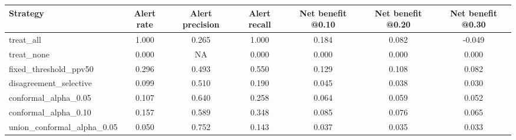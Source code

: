\begin{tabular}{@{}lcccccc@{}}
\toprule
Strategy & Alert rate & Alert precision & Alert recall & Net benefit @0.10 & Net benefit @0.20 & Net benefit @0.30\\
\midrule
treat\_all & 1.000 & 0.265 & 1.000 & 0.184 & 0.082 & -0.049\\
treat\_none & 0.000 & NA & 0.000 & 0.000 & 0.000 & 0.000\\
fixed\_threshold\_ppv50 & 0.296 & 0.493 & 0.550 & 0.129 & 0.108 & 0.082\\
disagreement\_selective & 0.099 & 0.510 & 0.190 & 0.045 & 0.038 & 0.030\\
conformal\_alpha\_0.05 & 0.107 & 0.640 & 0.258 & 0.064 & 0.059 & 0.052\\
conformal\_alpha\_0.10 & 0.157 & 0.589 & 0.348 & 0.085 & 0.076 & 0.065\\
union\_conformal\_alpha\_0.05 & 0.050 & 0.752 & 0.143 & 0.037 & 0.035 & 0.033\\
\bottomrule
\end{tabular}
